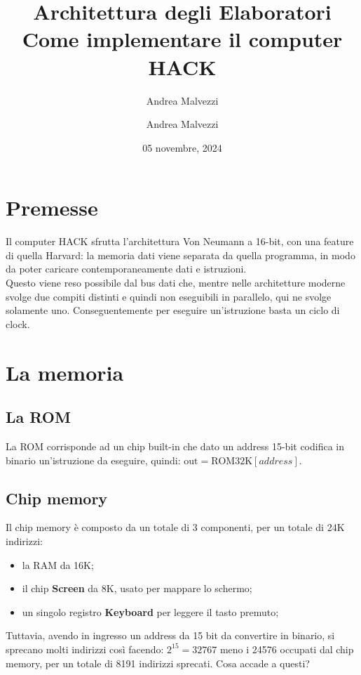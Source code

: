 \documentclass[12pt]{article}
\author{Andrea Malvezzi}
\title{\textbf{Architettura degli Elaboratori\\ Come implementare il computer HACK}}
\date{05 novembre, 2024}
\author{Andrea Malvezzi}
\begin{document}
\maketitle
\pagebreak
\tableofcontents
\pagebreak

\section{Premesse}
\label{sec:premises}
Il computer HACK sfrutta l'architettura Von Neumann a 16-bit, con una feature di quella Harvard:
la memoria dati viene separata da quella programma, in modo da poter caricare contemporaneamente dati e istruzioni.
\\
Questo viene reso possibile dal bus dati che, mentre nelle architetture moderne svolge due compiti distinti e quindi non eseguibili in parallelo, qui ne svolge solamente uno.
Conseguentemente per eseguire un'istruzione basta un ciclo di clock.

\section{La memoria}
\label{sec:memory}

\subsection{La ROM}
\label{ssec:ROM}
La ROM corrisponde ad un chip built-in che dato un address 15-bit codifica in binario
un'istruzione da eseguire, quindi: $\text{out} = \text{ROM}32\text{K}[address]$.

\subsection{Chip memory}
\label{ssec:memory_chip}
Il chip memory è composto da un totale di 3 componenti, per un totale di 24K indirizzi:
\begin{itemize}
    \item la RAM da 16K;
    \item il chip \textbf{Screen} da 8K, usato per mappare lo schermo;
    \item un singolo registro \textbf{Keyboard} per leggere il tasto premuto;
\end{itemize} 
Tuttavia, avendo in ingresso un address da 15 bit da convertire in binario, si sprecano molti indirizzi così facendo: $2^{15}=32767$ meno i 24576 occupati dal chip memory, per un totale di 8191 indirizzi sprecati. Cosa accade a questi?
\end{document}

